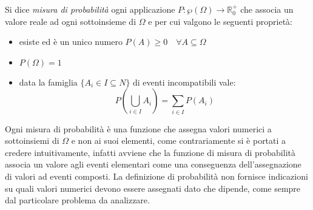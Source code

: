 \documentclass[a4paper,12pt, oneside]{book}
\newcommand{\numberset}{\mathbb}
\newcommand{\R}{\numberset{R}}
\begin{document}
Si dice \emph{misura di probabilità} ogni applicazione $P: \wp(\Omega) \to \R_0 ^ +$
che associa un valore reale ad ogni sottoinsieme di $\Omega$ e per cui valgono le seguenti proprietà:
\begin{itemize}
        \item esiste ed è un unico numero $P(A) \geq 0 \quad \forall A \subseteq \Omega$
        \item $P(\Omega) = 1$ 
        \item data la famiglia $\{A_i\in I\subseteq N\}$ di eventi incompatibili vale:
                \[ P\left(\bigcup_{i\in I}A_i\right) = \sum_{i\in I} P(A_i) \]
\end{itemize}
Ogni misura di probabilità è una funzione che assegna valori numerici a sottoinsiemi di $\Omega$
e non ai suoi elementi, come contrariamente si è portati a credere intuitivamente,
infatti avviene che la funzione di misura di probabilità associa un valore agli eventi elementari
come una conseguenza dell'assegnazione di valori ad eventi composti.\newline
La definizione di probabilità non fornisce indicazioni su quali valori numerici devono essere assegnati dato che dipende,
come sempre dal particolare problema da analizzare.
\end{document}
